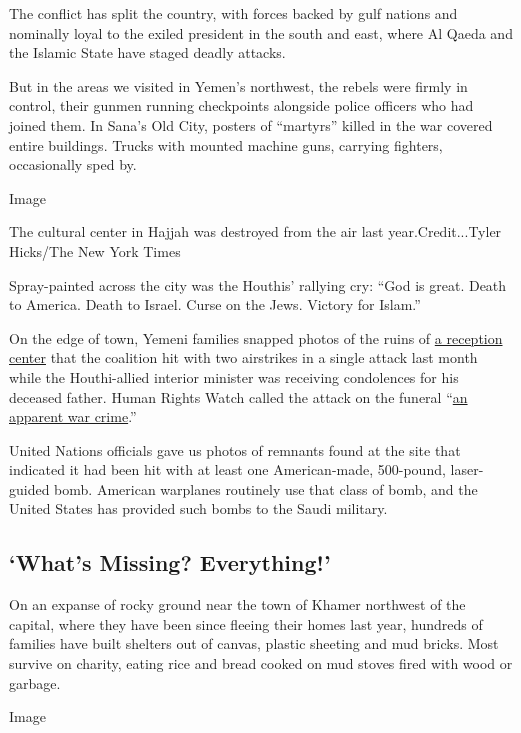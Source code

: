 The conflict has split the country, with forces backed by gulf nations
and nominally loyal to the exiled president in the south and east, where
Al Qaeda and the Islamic State have staged deadly attacks.

But in the areas we visited in Yemen's northwest, the rebels were firmly
in control, their gunmen running checkpoints alongside police officers
who had joined them. In Sana's Old City, posters of ``martyrs'' killed
in the war covered entire buildings. Trucks with mounted machine guns,
carrying fighters, occasionally sped by.

Image

The cultural center in Hajjah was destroyed from the air last
year.Credit...Tyler Hicks/The New York Times

Spray-painted across the city was the Houthis' rallying cry: ``God is
great. Death to America. Death to Israel. Curse on the Jews. Victory for
Islam.''

On the edge of town, Yemeni families snapped photos of the ruins of
\href{http://www.nytimes.com/video/world/middleeast/100000004736495/in-the-rubble-of-an-airstrike-in-yemen.html}{a
reception center} that the coalition hit with two airstrikes in a single
attack last month while the Houthi-allied interior minister was
receiving condolences for his deceased father. Human Rights Watch called
the attack on the funeral
``\href{https://www.hrw.org/news/2016/10/13/yemen-saudi-led-funeral-attack-apparent-war-crime}{an
apparent war crime}.''

United Nations officials gave us photos of remnants found at the site
that indicated it had been hit with at least one American-made,
500-pound, laser-guided bomb. American warplanes routinely use that
class of bomb, and the United States has provided such bombs to the
Saudi military.

\hypertarget{whats-missing-everything}{%
\subsection{`What's Missing?
Everything!'}\label{whats-missing-everything}}

On an expanse of rocky ground near the town of Khamer northwest of the
capital, where they have been since fleeing their homes last year,
hundreds of families have built shelters out of canvas, plastic sheeting
and mud bricks. Most survive on charity, eating rice and bread cooked on
mud stoves fired with wood or garbage.

Image

